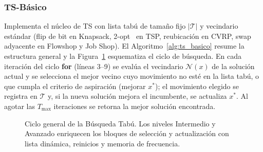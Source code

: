 \subsubsection{TS-Básico}
Implementa el núcleo de TS con lista tabú de tamaño fijo $|\mathcal{T}|$
y vecindario estándar (flip de bit en Knapsack,
2-opt~\cite{croes1958method,lin1973effective} en TSP,
reubicación en CVRP, swap adyacente en Flowshop y Job Shop).
El Algoritmo~\ref{alg:ts_basico} resume la estructura general y la
Figura~\ref{fig:ciclo_ts} esquematiza el ciclo de búsqueda.
En cada iteración del ciclo \textbf{for} (líneas 3--9) se evalúa el
vecindario $\mathcal{N}(x)$ de la solución actual y se selecciona el mejor
vecino cuyo movimiento no esté en la lista tabú, o que cumpla el criterio
de aspiración (mejorar $x^*$); el movimiento elegido se registra en
$\mathcal{T}$ y, si la nueva solución mejora el incumbente, se actualiza
$x^*$.
Al agotar las $T_{\max}$ iteraciones se retorna la mejor solución
encontrada.

\begin{figure}[t]
  \centering
  \caption{Ciclo general de la Búsqueda Tabú. Los niveles Intermedio y
           Avanzado enriquecen los bloques de selección y actualización
           con lista dinámica, reinicios y memoria de frecuencia.}
  \label{fig:ciclo_ts}
\end{figure}


